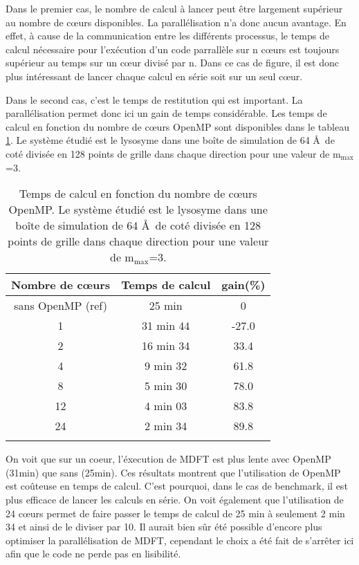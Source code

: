 Dans le premier cas, le nombre de calcul à lancer peut être largement supérieur au nombre de cœurs disponibles. La parallélisation n'a donc aucun avantage. En effet, à cause de la communication entre les différents processus, le temps de calcul nécessaire pour l’exécution d'un code parrallèle sur n cœurs est toujours supérieur au temps sur un cœur divisé par n. Dans ce cas de figure, il est donc plus intéressant de lancer chaque calcul en série soit sur un seul cœur.

Dans le second cas, c'est le temps de restitution qui est important. La parallélisation permet donc ici un gain de temps considérable. Les temps de calcul en fonction du nombre de cœurs OpenMP sont disponibles dans le tableau \ref{tab:perf_minimiseurs}. Le système étudié est le lysosyme dans une boîte de simulation de 64 \AA\ de coté divisée en 128 points de grille dans chaque direction pour une valeur de $\mathrm{m}_\mathrm{max}$=3.



\begin{table}[ht]
 \centering
  \begin{tabular}{c | c | c}
      Nombre de cœurs & Temps de calcul & gain(\%)\\
    \hline
    sans OpenMP (ref) & 25 min & 0\\
     1 & 31 min 44 & -27.0 \\
     2 & 16 min 34 &  33.4 \\
     4 &  9 min 32 &  61.8 \\
     8 &  5 min 30 &  78.0 \\
    12 &  4 min 03 &  83.8 \\
    24 &  2 min 34 &  89.8 \\
    \hline \multicolumn{3}{c}{} \\[-1em]\hline
  \end{tabular}
  \caption[Temps de calcul en fonction du nombre de cœurs OpenMP.]{Temps de calcul en fonction du nombre de cœurs OpenMP. Le système étudié est le lysosyme dans une boîte de simulation de 64 \AA\ de coté divisée en 128 points de grille dans chaque direction pour une valeur de $\mathrm{m}_\mathrm{max}$=3.}
  \label{tab:perf_minimiseurs}  
\end{table}


On voit que sur un coeur, l'éxecution de MDFT est plus lente avec OpenMP (31min) que sans (25min). Ces résultats montrent que l'utilisation de OpenMP est co\^uteuse en temps de calcul. C'est pourquoi, dans le cas de benchmark, il est plus efficace de lancer les calculs en série. On voit également que l'utilisation de 24 cœurs permet de faire passer le temps de calcul de 25 min à seulement 2 min 34 et ainsi de le diviser par 10. Il aurait bien sûr été possible d'encore plus optimiser la parallélisation de MDFT, cependant le choix a été fait de s’arrêter ici afin que le code ne perde pas en lisibilité.




